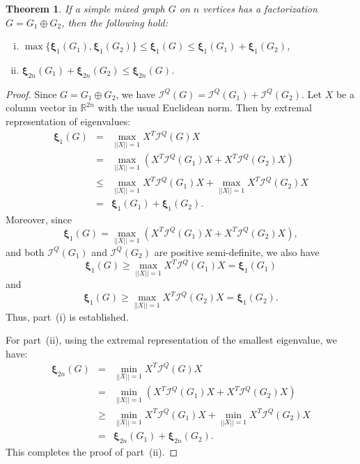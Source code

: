 \documentclass[12pt]{article}
\numberwithin{equation}{section}
\newtheorem{thm}{Theorem}[section]
\begin{document}
	\begin{thm}\label{thm-factorization ineqq}
		If a simple mixed graph $G$ on $n$ vertices has a  factorization $G=G_1\oplus G_2$, then the following hold:
		\begin{enumerate}[(i)]
			\item $\max\{\bm{\xi}_{1}(G_1),\bm{\xi}_{1}(G_2)\}\leq\bm{\xi}_{1}(G)\leq\bm{\xi}_{1}(G_1)+\bm{\xi}_{1}(G_2)$,
			\item $\bm{\xi}_{2n}(G_1)+\bm{\xi}_{2n}(G_2)\leq \bm{\xi}_{2n}(G)$.
		\end{enumerate}
	\end{thm}
	\begin{proof}
		Since $G=G_1\oplus G_2$, we have $\mathcal{I}^Q(G)=\mathcal{I}^Q(G_1)+\mathcal{I}^Q(G_2)$. Let $X$ be a column vector in $\mathbb{R}^{2n}$ with the usual Euclidean norm. Then by extremal representation of eigenvalues:
		\begin{eqnarray*}
			\bm{\xi}_1(G)&=&\underset{||X||=1}{\max}X^T\mathcal{I}^Q(G)X\\
			&=&\underset{||X||=1}{\max}(X^T\mathcal{I}^Q(G_1)X+X^T\mathcal{I}^Q(G_2)X)\\
			&\leq&\underset{||X||=1}{\max}X^T\mathcal{I}^Q(G_1)X+\underset{||X||=1}{\max}X^T\mathcal{I}^Q(G_2)X\\
			&=&\bm{\xi}_1(G_1)+\bm{\xi}_1(G_2).
		\end{eqnarray*}
		Moreover, since
	\begin{equation*}
		\bm{\xi}_1(G)=\underset{||X||=1}{\max}(X^T\mathcal{I}^Q(G_1)X+X^T\mathcal{I}^Q(G_2)X), 		
	\end{equation*}		
		and both $\mathcal{I}^Q(G_1)$ and $\mathcal{I}^Q(G_2)$ are positive semi-definite,
		we also have 
		\begin{equation*}
			\bm{\xi}_1(G)\geq\underset{||X||=1}{\max}X^T\mathcal{I}^Q(G_1)X=\bm{\xi}_1(G_1)
		\end{equation*}		
			 and 	
		\begin{equation*}
			 		\bm{\xi}_1(G)\geq\underset{||X||=1}{\max}X^T\mathcal{I}^Q(G_2)X=\bm{\xi}_1(G_2).
		\end{equation*}	
	Thus, part~(i) is established.
		
		For part~(ii), using the extremal representation of the smallest eigenvalue, we have:
		\begin{eqnarray*}
			\bm{\xi}_{2n}(G)&=&\underset{||X||=1}{\min}X^T\mathcal{I}^Q(G)X\\
			&=&\underset{||X||=1}{\min}(X^T\mathcal{I}^Q(G_1)X+X^T\mathcal{I}^Q(G_2)X)\\
			&\geq&\underset{||X||=1}{\min}X^T\mathcal{I}^Q(G_1)X+\underset{||X||=1}{\min}X^T\mathcal{I}^Q(G_2)X\\
			&=&\bm{\xi}_{2n}(G_1)+\bm{\xi}_{2n}(G_2).
		\end{eqnarray*}
		This completes the proof of part~(ii).
	\end{proof}
\end{document}
